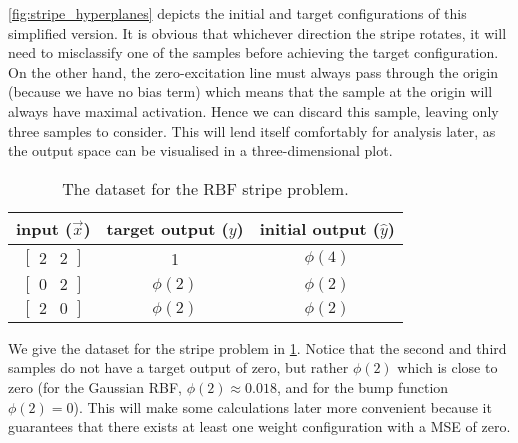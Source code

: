 \ref{fig:stripe_hyperplanes} depicts the initial and target configurations of this simplified version. 
It is obvious that whichever direction the stripe rotates, it will need to misclassify one of the samples before achieving the target configuration.
On the other hand, the zero-excitation line must always pass through the origin (because we have no bias term) which means that the sample at the origin will always have maximal activation.
Hence we can discard this sample, leaving only three samples to consider. 
This will lend itself comfortably for analysis later, as the output space can be visualised in a three-dimensional plot.

\begin{table}[h!]
    \centering
    \begin{tabular}{c|c|c}
        input ($\vec{x}$) & target output ($y$) & initial output ($\hat{y}$) \\
        \hline
        $\begin{bmatrix} 2 & 2 \end{bmatrix}$
        & 1 & $\phi\left( 4 \right)$
        \\
        $\begin{bmatrix} 0 & 2 \end{bmatrix}$
        & $\phi\left( 2 \right)$ & $\phi\left( 2 \right)$
        \\
        $\begin{bmatrix} 2 & 0 \end{bmatrix}$
        & $\phi\left(2 \right)$ & $\phi\left( 2 \right)$
    \end{tabular}
    \caption{The dataset for the RBF stripe problem.}
    \label{table:stripe_dataset}
\end{table}
We give the dataset for the stripe problem in \ref{table:stripe_dataset}.
Notice that the second and third samples do not have a target output of zero, but rather $\phi(2)$ which is close to zero (for the Gaussian RBF, $\phi(2) \approx 0.018$, and for the bump function $\phi(2) = 0$).
This will make some calculations later more convenient because it guarantees that there exists at least one weight configuration with a MSE of zero.

